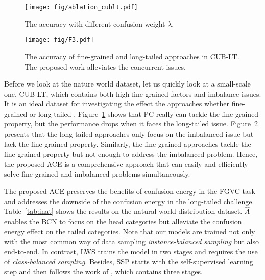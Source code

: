\documentclass{article}
\begin{document}
\begin{figure}[ht!]
    \centering
    \texttt{[image: fig/ablation\_cublt.pdf]}
    \caption{The accuracy with different confusion weight $\lambda$.}
    \label{fig:cub_lt}
    \vspace{-10pt}
\end{figure}

\begin{figure}[ht]
    \centering
    \texttt{[image: fig/F3.pdf]}
    \caption{The accuracy of fine-grained and long-tailed approaches in CUB-LT. The proposed work alleviates the concurrent issues.}
    \label{tab:cub_lt}
    \vspace{-10pt}
\end{figure}

Before we look at the nature world dataset, let us quickly look at a small-scale one, CUB-LT, which contains both high fine-grained factors and imbalance issues. It is an ideal dataset for investigating the effect the approaches whether fine-grained \cite{dubey2018pairwise,DBLP:conf/eccv/DuCBXMSG20} or long-tailed \cite{Kang2020Decoupling,samuel2021generalized}. Figure~\ref{fig:cub_lt} shows that PC really can tackle the fine-grained property, but the performance drops when it faces the long-tailed issue. Figure~\ref{tab:cub_lt} presents that the long-tailed approaches only focus on the imbalanced issue but lack the fine-grained property. Similarly, the fine-grained approaches tackle the fine-grained property but not enough to address the imbalanced problem. Hence, the proposed ACE is a comprehensive approach that can easily and efficiently solve fine-grained and imbalanced problems simultaneously.

The proposed ACE preserves the benefits of confusion energy in the FGVC task and addresses the downside of the confusion energy in the long-tailed challenge. Table~\ref{tab:inat} shows the results on the natural world distribution dataset. $\hat{A}$ enables the BCN to focus on the head categories but alleviate the confusion energy effect on the tailed categories. Note that our models are trained not only with the most common way of data sampling {\em instance-balanced sampling} but also end-to-end. In contrast, LWS \cite{Kang2020Decoupling} trains the model in two stages and requires the use of {\em class-balanced sampling}. Besides, SSP \cite{DBLP:conf/nips/YangX20} starts with the self-supervised learning step and then follows the work of \cite{Kang2020Decoupling}, which contains three stages.
\end{document}
